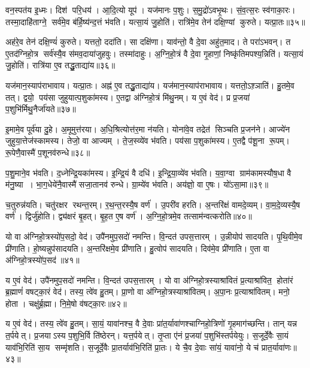 वन॒स्पत॑य इ॒ध्मः।
दिश॑ परि॒धय॑।
आ॒दि॒त्यो यूप॑।
यज॑मानः प॒शुः।
स॒मु॒द्रो॑ऽवभृ॒थः।
सं॒व॒त्स॒रः स्व॑गाका॒रः।
तस्मा॒दाहि॑ताग्ने॒ सर्व॑मे॒व ब॑र्\mbox{}हि॒ष्य॑न्द॒त्तं भ॑वति।
यत्सा॒यं जु॒होति॑।
रात्रि॑मे॒व तेन॑ दक्षि॒ण्यां कुरुते।
यत्प्रा॒तः॥३५॥

अह॑रे॒व तेन॑ दक्षि॒ण्यं॑ कुरुते।
यत्ततो॒ ददा॑ति।
सा दक्षि॑णा।
याव॑न्तो॒ वै दे॒वा अहु॑त॒माद\sn{}।
ते परा॑ऽभवन्।
त ए॒तद॑ग्निहो॒त्र सर्व॑स्यै॒व स॑मव॒दाया॑जुहवुः।
तस्मा॑दाहुः।
अ॒ग्नि॒हो॒त्रं वै दे॒वा गृ॒हाणां॒ निष्कृ॑तिमपश्य॒न्निति॑।
यत्सा॒यं जु॒होति॑।
रात्रि॑या ए॒व तद्धु॒ताद्या॑य॥३६॥

यज॑मान॒स्याप॑राभावाय।
यत्प्रा॒तः।
अह्न॑ ए॒व तद्धु॒ताद्या॑य।
यज॑मान॒स्याप॑राभावाय।
यत्ततो॒ऽश़्ञाति॑।
हु॒तमे॒व तत्।
द्वयो॒ पय॑सा जुहुयात्प॒शुका॑मस्य।
ए॒तद्वा अ॑ग्निहो॒त्रं मि॑थु॒नम्।
य ए॒वं वेद॑।
प्र प्र॒जया॑ प॒शुभि॑र्मिथु॒नैर्जा॑यते॥३७॥

इ॒मामे॒व पूर्व॑या दु॒हे।
अ॒मूमुत्त॑रया।
अ॒धि॒श्रित्योत्त॑र॒मा न॑यति।
योना॑वे॒व तद्रेत॑ सिञ्चति प्र॒जन॑ने।
आज्ये॑न जुहुया॒त्तेज॑स्कामस्य।
तेजो॒ वा आज्यम्।
ते॒ज॒स्व्ये॑व भ॑वति।
पय॑सा प॒शुका॑मस्य।
ए॒तद्वै प॑शू॒ना रू॒पम्।
रू॒पेणै॒वास्मै॑ प॒शूनव॑रुन्धे॥३८॥

प॒शु॒माने॒व भ॑वति।
द॒ध्नेन्द्रि॒यका॑मस्य।
इ॒न्द्रि॒यं वै दधि॑।
इ॒न्द्रि॒या॒व्ये॑व भ॑वति।
य॒वा॒ग्वा ग्राम॑कामस्यौष॒धा वै म॑नु॒ष्या।
भा॒ग॒धेये॑नै॒वास्मै॑ सजा॒तानव॑ रुन्धे।
ग्रा॒म्ये॑व भ॑वति।
अय॑ज्ञो॒ वा ए॒षः।
यो॑ऽसा॒मा॥३९॥

च॒तुरुन्न॑यति।
चतु॑रक्षर रथन्त॒रम्।
र॒थ॒न्त॒रस्यै॒ष वर्ण॑।
उ॒परी॑व हरति।
अ॒न्तरि॑क्षं वामदे॒व्यम्।
वा॒म॒दे॒व्यस्यै॒ष वर्ण॑।
द्विर्जु॑होति।
द्व्य॑क्षरं बृ॒हत्।
बृ॒ह॒त ए॒ष वर्ण॑।
अ॒ग्नि॒हो॒त्रमे॒व तत्साम॑न्वत्करोति॥४०॥

यो वा अ॑ग्निहो॒त्रस्यो॑प॒सदो॒ वेद॑।
उपै॑नमुप॒सदो॑ नमन्ति।
वि॒न्दत॑ उपस॒त्तारम्।
उ॒न्नीयोप॑ सादयति।
पृ॒थि॒वीमे॒व प्री॑णाति।
हो॒ष्यन्नुप॑सादयति।
अ॒न्तरि॑क्षमे॒व प्री॑णाति।
हु॒त्वोप॑ सादयति।
दिव॑मे॒व प्री॑णाति।
ए॒ता वा अ॑ग्निहो॒त्रस्यो॑प॒सद॑॥४१॥

य ए॒वं वेद॑।
उपै॑नमुप॒सदो॑ नमन्ति।
वि॒न्दत॑ उपस॒त्तारम्।
यो वा अ॑ग्निहो॒त्रस्याश्रा॑वितं प्र॒त्याश्रा॑वित॒ होता॑रं ब्र॒ह्माणं॑ वषट्का॒रं वेद॑।
तस्य॒ त्वे॑व हु॒तम्।
प्रा॒णो वा अ॑ग्निहो॒त्रस्याश्रा॑वितम्।
अ॒पा॒नः प्र॒त्याश्रा॑वितम्।
मनो॒ होता।
चक्षु॑र्ब्र॒ह्मा।
नि॒मे॒षो व॑षट्का॒रः॥४२॥

य ए॒वं वेद॑।
तस्य॒ त्वे॑व हु॒तम्।
सा॒यं॒ यावा॑नश्च॒ वै दे॒वाः प्रा॑त॒र्यावा॑णश्चाग्निहो॒त्रिणो॑ गृ॒हमाग॑च्छन्ति।
तान् यन्न त॒र्पयेत्।
प्र॒जयाऽस्य प॒शुभि॒र्वि ति॑ष्ठेरन्।
यत्त॒र्पयेत्।
तृ॒प्ता ए॑नं प्र॒जया॑ प॒शुभि॑स्तर्पयेयुः।
स॒जूर्दे॒वैः सा॒यं याव॑भि॒रिति॑ सा॒य सम्मृ॑शति।
स॒जूर्दे॒वैः प्रा॒तर्याव॑भि॒रिति॑ प्रा॒तः।
ये चै॒व दे॒वाः सा॑यं॒ यावा॑नो॒ ये च॑ प्रात॒र्यावा॑णः॥४३॥

